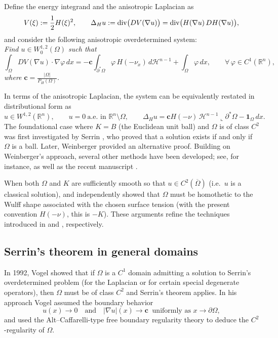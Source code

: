 \documentclass[reqno,11pt]{amsart}
\numberwithin{equation}{section}
\theoremstyle{remark}
\begin{document}
Define the energy integrand and the anisotropic Laplacian as
\[
V(\xi):=\frac12 H(\xi)^2,
\qquad 
\Delta_H u := {\rm div}\bigl(DV(\nabla u)\bigr)={\rm div}\bigl(H(\nabla u)\,DH(\nabla u)\bigr),
\]
and consider the following anisotropic overdetermined system:\\
\emph{Find 
$u\in W^{1,2}_0(\Omega)$ such that
\begin{equation*}
\int_{\Omega} DV(\nabla u)\cdot \nabla\varphi \, dx
= -\mathbf{c}\int_{\partial^* \Omega} \varphi \, H(-\nu_x)\, d\mathscr{H}^{n-1}
+ \int_{\Omega} \varphi \, dx,
\qquad \forall\, \varphi\in C^1(\mathbb{R}^n),
\end{equation*}
where $\mathbf{c}=\frac{|\Omega|}{P_H(\Omega)}$.}

In terms of the anisotropic Laplacian,
the system can be equivalently restated in distributional form as
\[
u \in W^{1,2}(\mathbb R^n), \qquad u=0\ \text{a.e.\ in }\mathbb R^n\setminus \Omega,\qquad
\Delta_H u=\mathbf{c}H(-\nu)\,\mathscr{H}^{n-1}\llcorner \partial^*\Omega - \mathbf{1}_{\Omega}\,dx.
\]
The foundational case where $K=B$ (the Euclidean unit ball) and $\Omega$ is of class $C^2$ was first investigated by Serrin
\cite{S1971}, who proved that a solution exists if and only if $\Omega$ is a ball. Later, Weinberger \cite{W1971} provided an alternative proof. Building on Weinberger's approach, several other
methods have been developed; see, for instance, \cite{BNST2008, CH1998, PS1989} as well as the recent manuscript \cite{CWZ2025}.

When both $\Omega$ and $K$ are sufficiently smooth so that $u\in C^2(\overline{\Omega})$ (i.e.\ $u$ is a classical solution),
\cite{CS2009} and \cite{WX2011} independently showed that $\Omega$ must be homothetic to {the Wulff shape associated with the chosen surface tension (with the present convention $H(-\nu)$, this is $-K$)}. These arguments refine the techniques introduced in \cite{BNST2008} and \cite{W1971},
respectively.

\subsection{Serrin's theorem in general domains}

In 1992, Vogel \cite{V1992} showed that if $\Omega$ is a $C^1$ domain admitting a solution to Serrin's overdetermined problem
(for the Laplacian or for certain special degenerate operators), then $\Omega$ must  be of class $C^{2}$ and Serrin's theorem applies.
In his approach Vogel assumed the boundary behavior
\[
u(x)\to 0 \quad \text{and}\quad |\nabla u|(x)\to \mathbf{c} \ \text{ uniformly as } x\to \partial \Omega,
\]
and used the Alt--Caffarelli-type free boundary regularity theory to deduce the $C^2$-regularity of $\Omega$.
\end{document}
